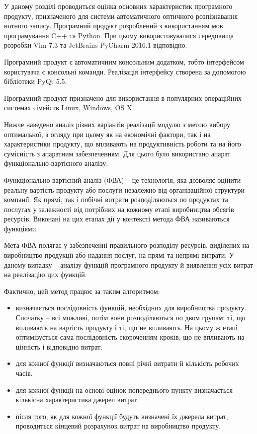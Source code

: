 \hspace{10pt}

У даному розділі проводиться оцінка основних характеристик програмного продукту, призначеного для системи автоматичного оптичного розпізнавання нотного запису. Програмний продукт розроблений з використанням мов програмування C++ та Python. При цьому використовувалися середовища розробки Vim 7.3 та JetBrains PyCharm 2016.1 відповідно.

Програмний продукт є автоматичним консольним додатком, тобто інтерфейсом користувача є консольні команди. Реалізація інтерфейсу створена за допомогою бібліотеки PyQt 5.5.

Програмний продукт призначено для використання в популярних операційних системах сімейств Linux, Windows, OS X.

Нижче наведено аналіз різних варіантів реалізації модулю з метою вибору оптимальної, з огляду при цьому як на економічні фактори, так і на характеристики продукту, що впливають на продуктивність роботи та на його сумісність з апаратним забезпеченням. Для цього було використано апарат функціонально-вартісного аналізу.

Функціонально-вартісний аналіз (ФВА) -- це технологія, яка дозволяє оцінити реальну вартість продукту або послуги незалежно від організаційної структури компанії. Як прямі, так і побічні витрати розподіляються по продуктах та послугах у залежності від потрібних на кожному етапі виробництва обсягів ресурсів. Виконані на цих етапах дії у контексті метода ФВА називаються функціями.

Мета ФВА полягає у забезпеченні правильного розподілу ресурсів, виділених на виробництво продукції або надання послуг, на прямі та непрямі витрати. У даному випадку -- аналізу функцій програмного продукту й виявлення усіх витрат на реалізацію цих функцій. 

Фактично, цей метод працює за таким алгоритмом:
\begin{itemize}
	\item визначається послідовність функцій, необхідних для виробництва продукту. Спочатку -- всі можливі, потім вони розподіляються по двом групам: ті, що впливають на вартість продукту і ті, що не впливають. На цьому ж етапі оптимізується сама послідовність скороченням кроків, що не впливають на цінність і відповідно витрат.
	\item для кожної функції визначаються повні річні витрати й кількість робочих часів.
	\item для кожної функції на основі оцінок попереднього пункту визначається кількісна характеристика джерел витрат.
	\item після того, як для кожної функції будуть визначені їх джерела витрат, проводиться кінцевий розрахунок витрат на виробництво продукту.
\end{itemize}